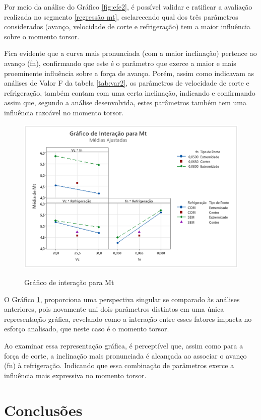 \documentclass[deposito, acronym, symbols]{fei}
\begin{document}
Por meio da análise do Gráfico \ref{fig:efe2}, é possível validar e ratificar a avaliação realizada no segmento \ref{regressão mt}, esclarecendo qual dos três parâmetros considerados (avanço, velocidade de corte e refrigeração) tem a maior influência sobre o momento torsor. 

Fica evidente que a curva mais pronunciada (com a maior inclinação) pertence ao avanço (fn), confirmando que este é o parâmetro que exerce a maior e mais proeminente influência sobre a força de avanço. Porém, assim como indicavam as análises de Valor F da tabela \ref{tab:var2}, os parâmetros de velocidade de corte e refrigeração, também contam com uma certa inclinação, indicando e confirmando assim que, segundo a análise desenvolvida, estes parâmetros também tem uma influência razoável no momento torsor.

\begin{figure}[!htp]
    \centering
    \caption{Gráfico de interação para Mt}
    \includegraphics[width=0.8\linewidth]{Imagens/interação2.png}
    \label{fig:int2}
\end{figure}

O Gráfico \ref{fig:int2}, proporciona uma perspectiva singular se comparado às análises anteriores, pois novamente uni dois parâmetros distintos em uma única representação gráfica, revelando como a interação entre esses fatores impacta no esforço analisado, que neste caso é o momento torsor. 

Ao examinar essa representação gráfica, é perceptível que, assim como para a força de corte, a inclinação mais pronunciada é alcançada ao associar o avanço (fn) à refrigeração. Indicando que essa combinação de parâmetros exerce a influência mais expressiva no momento torsor. 


\chapter{Conclusões}
\end{document}
